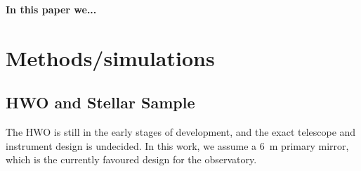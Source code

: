 \documentclass[
    usenatbib,
]{mnras}
\begin{document}
\textbf{In this paper we...}






 



\section{Methods/simulations}
\subsection{HWO and Stellar Sample}
The HWO is still in the early stages of development, and the exact telescope and instrument design is undecided. 
In this work, we assume a \SI{6}{\meter} primary mirror, which is the currently favoured design for the observatory.
\end{document}
